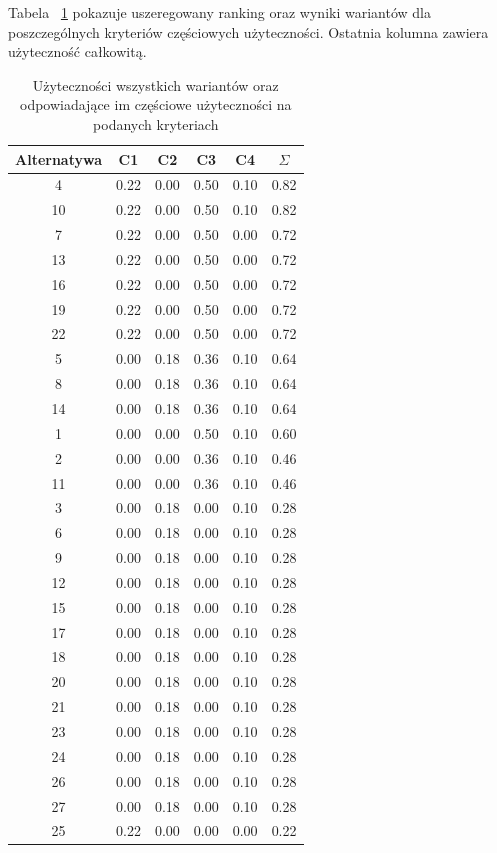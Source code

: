 \documentclass[11pt]{article}
\begin{document}
Tabela ~\ref{tab:utility_values} pokazuje uszeregowany ranking oraz wyniki wariantów dla poszczególnych kryteriów częściowych użyteczności. Ostatnia kolumna zawiera użyteczność całkowitą.
\begin{table}[H]
    \centering
    \begin{tabular}{|c|c|c|c|c|c|}
        \hline
        Alternatywa & C1  & C2  & C3  & C4  & $\Sigma$ \\
        \hline
        4  & 0.22 & 0.00 & 0.50 & 0.10 & 0.82 \\
        10 & 0.22 & 0.00 & 0.50 & 0.10 & 0.82 \\
        7  & 0.22 & 0.00 & 0.50 & 0.00 & 0.72 \\
        13 & 0.22 & 0.00 & 0.50 & 0.00 & 0.72 \\
        16 & 0.22 & 0.00 & 0.50 & 0.00 & 0.72 \\
        19 & 0.22 & 0.00 & 0.50 & 0.00 & 0.72 \\
        22 & 0.22 & 0.00 & 0.50 & 0.00 & 0.72 \\
        5  & 0.00 & 0.18 & 0.36 & 0.10 & 0.64 \\
        8  & 0.00 & 0.18 & 0.36 & 0.10 & 0.64 \\
        14 & 0.00 & 0.18 & 0.36 & 0.10 & 0.64 \\
        1  & 0.00 & 0.00 & 0.50 & 0.10 & 0.60 \\
        2  & 0.00 & 0.00 & 0.36 & 0.10 & 0.46 \\
        11 & 0.00 & 0.00 & 0.36 & 0.10 & 0.46 \\
        3  & 0.00 & 0.18 & 0.00 & 0.10 & 0.28 \\
        6  & 0.00 & 0.18 & 0.00 & 0.10 & 0.28 \\
        9  & 0.00 & 0.18 & 0.00 & 0.10 & 0.28 \\
        12 & 0.00 & 0.18 & 0.00 & 0.10 & 0.28 \\
        15 & 0.00 & 0.18 & 0.00 & 0.10 & 0.28 \\
        17 & 0.00 & 0.18 & 0.00 & 0.10 & 0.28 \\
        18 & 0.00 & 0.18 & 0.00 & 0.10 & 0.28 \\
        20 & 0.00 & 0.18 & 0.00 & 0.10 & 0.28 \\
        21 & 0.00 & 0.18 & 0.00 & 0.10 & 0.28 \\
        23 & 0.00 & 0.18 & 0.00 & 0.10 & 0.28 \\
        24 & 0.00 & 0.18 & 0.00 & 0.10 & 0.28 \\
        26 & 0.00 & 0.18 & 0.00 & 0.10 & 0.28 \\
        27 & 0.00 & 0.18 & 0.00 & 0.10 & 0.28 \\
        25 & 0.22 & 0.00 & 0.00 & 0.00 & 0.22 \\
        \hline
    \end{tabular}
    \caption{Użyteczności wszystkich wariantów oraz odpowiadające im częściowe użyteczności na podanych kryteriach}
    \label{tab:utility_values}
\end{table}
\end{document}
